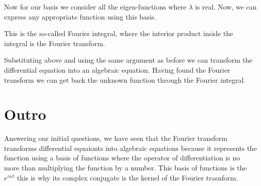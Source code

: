 \documentclass{article}
\begin{document}
Now for our basis we consider all the eigen-functions where $\lambda$ is real.
Now, we can express any appropriate function using this basis.

This is the so-called Fourier integral, where the interior product inside the integral is the Fourier transform.

Substituting above and using the same argument as before we can transform the differential equation into an algebraic equation.
Having found the Fourier transform we can get back the unknown function through the Fourier integral.

\section{Outro}

Answering our initial questions, we have seen that the Fourier transform transforms differential equaionts into algebraic equations because it represents the function using a basis of functions where the operator of differentiation is no more than multiplying the function by a number.
This basis of functions is the $e^{iwt}$ this is why its complex conjugate is the kernel of the Fourier trasnform.
\end{document}
